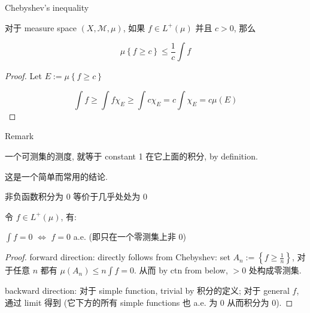 \documentclass{qlnotes-export}
\begin{document}
\begin{lemma}{Chebyshev's inequality}\label{lem-04-measurable-functions-and-integration-on-l-mu-chebyshev-s-inequality}

对于 measure space \((X,\mathcal{M},\mu)\), 如果 \(f \in L^{+}(\mu)\) 并且 \(c > 0\), 那么

\[\mu\left\{ {f \geq c} \right\} \leq \frac{1}{c}\int f\]

\end{lemma}

\begin{proof}

Let \(E := \mu\left\{ {f \geq c} \right\}\)

\[\int f \geq \int f\chi_{E} \geq \int c\chi_{E} = c\int\chi_{E} = c\mu(E)\]

\end{proof}

\begin{qlremark}{Remark}

一个可测集的测度, 就等于 constant 1 在它上面的积分, by definition.

这是一个简单而常用的结论.

\end{qlremark}

\begin{proposition}{非负函数积分为 0 等价于几乎处处为 0}\label{prop-04-measurable-functions-and-integration-on-l-mu-0-0}

令 \(f \in L^{+}(\mu)\), 有:

\(\int f = 0\) \(\Leftrightarrow\) \(f = 0\) a.e. (即只在一个零测集上非 0)

\end{proposition}

\begin{proof}

forward direction: directly follows from Chebyshev: set \(A_{n} := \left\{ {f \geq \frac{1}{n}} \right\}\), 对于任意 \(n\) 都有 \(\mu(A_{n}) \leq n\int f = 0\). 从而 by ctn from below, \(> 0\) 处构成零测集.

backward direction: 对于 simple function, trivial by 积分的定义; 对于 general \(f\), 通过 limit 得到 (它下方的所有 simple functions 也 a.e. 为 0 从而积分为 0).

\end{proof}
\end{document}
